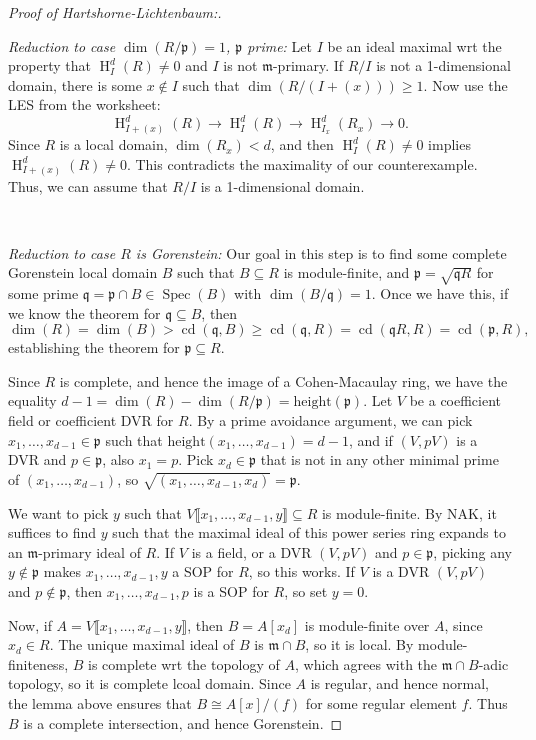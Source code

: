 \documentclass[11pt]{book}
\numberwithin{equation}{section}
\numberwithin{theorem}{chapter}
\theoremstyle{definition}
\newtheorem*{basic properties}{Basic Properties}
\newtheorem*{Important Remark}{Important Remark}
\theoremstyle{remark}
\newcommand{\m}{\mathfrak{m}}
\newcommand{\p}{\mathfrak{p}}
\newcommand{\q}{\mathfrak{q}}
\newcommand{\Spec}{\operatorname{Spec}}
\DeclareMathOperator{\cd}{cd}
\renewcommand{\dim}{\operatorname{dim}}
\renewcommand{\H}{\operatorname{H}}
\begin{document}
\begin{proof}[Proof of Hartshorne-Lichtenbaum:]
	
	\
	
	{\it Reduction to case $\dim(R/\p)=1$, $\p$ prime:} Let $I$ be an ideal maximal wrt the property that $\H^d_I(R)\neq 0$ and $I$ is not $\m$-primary. If $R/I$ is not a 1-dimensional domain, there is some $x\notin I$ such that $\dim(R/(I+(x)))\geq 1$. Now use the LES from the worksheet:
	\[ \H^d_{I+(x)}(R) \to \H^d_{I}(R) \to \H^d_{I_x}(R_x) \to 0. \]
	Since $R$ is a local domain, $\dim(R_x)<d$, and then $\H^d_{I}(R)\neq 0$ implies $\H^d_{I+(x)}(R)\neq 0$. This contradicts the maximality of our counterexample. Thus, we can assume that $R/I$ is a 1-dimensional domain.
	
		\
	
	{\it Reduction to case $R$ is Gorenstein:} Our goal in this step is to find some complete Gorenstein local domain $B$ such that $B\subseteq R$ is module-finite, and $\p=\sqrt{\q R}$ for some prime $\q=\p \cap B\in \Spec(B)$ with $\dim(B/\q)=1$. Once we have this, if we know the theorem for $\q \subseteq B$, then
	\[\dim(R)=\dim(B) > \cd(\q,B) \geq \cd(\q,R) = \cd(\q R,R) = \cd(\p, R),\]
	establishing the theorem for $\p \subseteq R$. 
	
	Since $R$ is complete, and hence the image of a Cohen-Macaulay ring, we have the equality $d-1 = \dim(R)-\dim(R/\p) = \mathrm{height}(\p)$. Let $V$ be a coefficient field or coefficient DVR for $R$. By a prime avoidance argument, we can pick $x_1,\dots,x_{d-1} \in \p$ such that $\mathrm{height}(x_1,\dots,x_{d-1})=d-1$, and if $(V,pV)$ is a DVR and $p\in \p$, also $x_1=p$. Pick $x_d \in \p$ that is not in any other minimal prime of $(x_1,\dots,x_{d-1})$, so $\sqrt{(x_1,\dots,x_{d-1},x_d)}=\p$. 
	
	We want to pick $y$ such that $V\llbracket x_1,\dots,x_{d-1},y\rrbracket\subseteq R$ is module-finite. By NAK, it suffices to find $y$ such that the maximal ideal of this power series ring expands to an $\m$-primary ideal of $R$. If $V$ is a field, or a DVR $(V,pV)$ and $p\in \p$, picking any $y \notin \p$ makes $x_1,\dots,x_{d-1},y$ a SOP for $R$, so this works. If $V$ is a DVR $(V,pV)$ and $p \notin \p$, then $x_1,\dots,x_{d-1},p$ is a SOP for $R$, so set $y=0$.
	
	Now, if $A=V\llbracket x_1,\dots,x_{d-1},y\rrbracket$, then $B=A[x_d]$ is module-finite over $A$, since $x_d\in R$. The unique maximal ideal of $B$ is $\m\cap B$, so it is local. By module-finiteness, $B$ is complete wrt the topology of $A$, which agrees with the $\m\cap B$-adic topology, so it is complete lcoal domain. Since $A$ is regular, and hence normal, the lemma above ensures that $B\cong A[x]/(f)$ for some regular element $f$. Thus $B$ is a complete intersection, and hence Gorenstein.
	

\end{proof}
\end{document}
